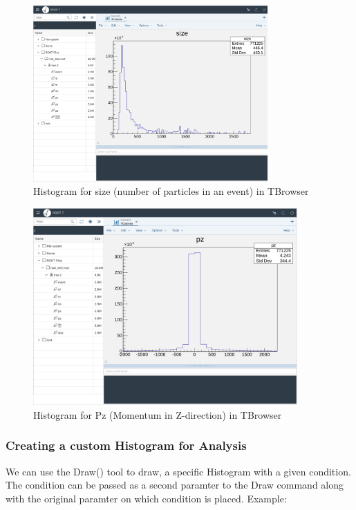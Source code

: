 \documentclass[letterpaper,12pt]{article}
\begin{document}
\begin{spacing}{1.125}
\begin{figure}[!ht]
  \includegraphics[width=0.8\textwidth]{size-hist.png}
  \caption{Histogram for size (number of particles in an event) in TBrowser}
  \label{size-hist}
\end{figure}

\begin{figure}[!ht]
  \includegraphics[width=0.9\textwidth]{pz-hist.png}
  \caption{Histogram for Pz (Momentum in Z-direction) in TBrowser}
  \label{pz-hist}
\end{figure}


\subsubsection{Creating a custom Histogram for Analysis}

We can use the Draw() tool to draw, a specific Histogram with a given
condition. The condition can be passed as a second paramter to the Draw command
along with the original paramter on which condition is placed. Example:



\end{spacing}
\end{document}
